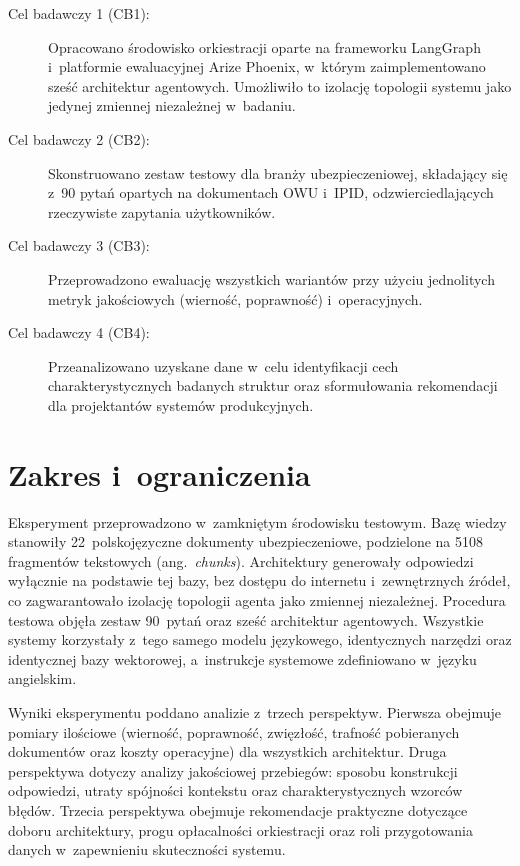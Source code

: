 \begin{description}
  \item[Cel badawczy 1 (CB1):] Opracowano środowisko orkiestracji oparte na frameworku
    LangGraph i~platformie ewaluacyjnej Arize Phoenix, w~którym zaimplementowano
    sześć architektur agentowych. Umożliwiło to izolację topologii systemu jako
    jedynej zmiennej niezależnej w~badaniu.

  \item[Cel badawczy 2 (CB2):] Skonstruowano zestaw testowy dla branży
    ubezpieczeniowej, składający się z~90 pytań opartych na dokumentach OWU i~IPID,
    odzwierciedlających rzeczywiste zapytania użytkowników.

  \item[Cel badawczy 3 (CB3):] Przeprowadzono ewaluację wszystkich wariantów przy
    użyciu jednolitych metryk jakościowych (wierność, poprawność) i~operacyjnych.

  \item[Cel badawczy 4 (CB4):] Przeanalizowano uzyskane dane w~celu identyfikacji cech
    charakterystycznych badanych struktur oraz sformułowania rekomendacji dla
    projektantów systemów produkcyjnych.
\end{description}

\section{Zakres i~ograniczenia}\label{sec:zakres}

Eksperyment przeprowadzono w~zamkniętym środowisku testowym. Bazę wiedzy
stanowiły 22~polskojęzyczne dokumenty ubezpieczeniowe, podzielone na 5108
fragmentów tekstowych (ang.~\textit{chunks}). Architektury generowały
odpowiedzi wyłącznie na podstawie tej bazy, bez dostępu do internetu
i~zewnętrznych źródeł, co zagwarantowało izolację topologii agenta jako
zmiennej niezależnej. Procedura testowa objęła zestaw 90~pytań oraz sześć
architektur agentowych. Wszystkie systemy korzystały z~tego samego modelu
językowego, identycznych narzędzi oraz identycznej bazy wektorowej,
a~instrukcje systemowe zdefiniowano w~języku angielskim.

Wyniki eksperymentu poddano analizie z~trzech perspektyw. Pierwsza obejmuje
pomiary ilościowe (wierność, poprawność, zwięzłość, trafność pobieranych
dokumentów oraz koszty operacyjne) dla wszystkich architektur. Druga
perspektywa dotyczy analizy jakościowej przebiegów: sposobu konstrukcji
odpowiedzi, utraty spójności kontekstu oraz charakterystycznych wzorców błędów.
Trzecia perspektywa obejmuje rekomendacje praktyczne dotyczące doboru
architektury, progu opłacalności orkiestracji oraz roli przygotowania danych
w~zapewnieniu skuteczności systemu.

